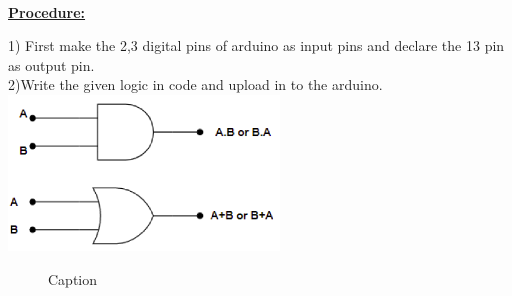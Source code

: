 \documentclass[letterpaper, 10 pt, conference]{ieeeconf}
\begin{document}
\vspace{5mm}
\\ \raggedright \textbf{\underline{Procedure:}}\vspace{2mm}
\\ \raggedright 1) First make the 2,3 digital pins of arduino as input pins and declare the 13 pin as output pin.
\\ 2)Write the given logic in code and upload in to the arduino.
    \includegraphics{pic.png}
\vspace{5cm}
\begin{figure}

    \centering
    

    \caption{Caption}
    \label{fig:my_label}
\end{figure}
\vspace{5mm}
\end{document}
